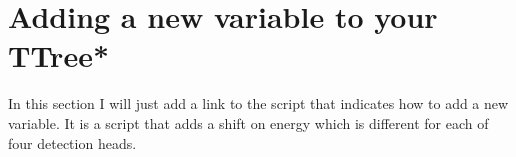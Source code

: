 \documentclass[12pt]{article}
\begin{document}
\clearpage
\section{Adding a new variable to your TTree*}
In this section I will just add a link to the script that indicates how to add a new variable. It is a script that adds a shift on energy which is different for each of four detection heads.   







%
%
\end{document}
